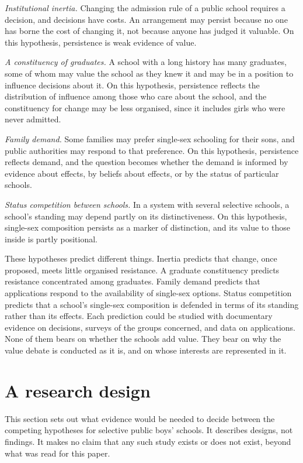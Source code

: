 \documentclass[11pt]{article}
\begin{document}
\emph{Institutional inertia.} Changing the admission rule of a public school requires a decision, and decisions have costs. An arrangement may persist because no one has borne the cost of changing it, not because anyone has judged it valuable. On this hypothesis, persistence is weak evidence of value.

\emph{A constituency of graduates.} A school with a long history has many graduates, some of whom may value the school as they knew it and may be in a position to influence decisions about it. On this hypothesis, persistence reflects the distribution of influence among those who care about the school, and the constituency for change may be less organised, since it includes girls who were never admitted.

\emph{Family demand.} Some families may prefer single-sex schooling for their sons, and public authorities may respond to that preference. On this hypothesis, persistence reflects demand, and the question becomes whether the demand is informed by evidence about effects, by beliefs about effects, or by the status of particular schools.

\emph{Status competition between schools.} In a system with several selective schools, a school's standing may depend partly on its distinctiveness. On this hypothesis, single-sex composition persists as a marker of distinction, and its value to those inside is partly positional.

These hypotheses predict different things. Inertia predicts that change, once proposed, meets little organised resistance. A graduate constituency predicts resistance concentrated among graduates. Family demand predicts that applications respond to the availability of single-sex options. Status competition predicts that a school's single-sex composition is defended in terms of its standing rather than its effects. Each prediction could be studied with documentary evidence on decisions, surveys of the groups concerned, and data on applications. None of them bears on whether the schools add value. They bear on why the value debate is conducted as it is, and on whose interests are represented in it.

\section{A research design}\label{sec:design}

This section sets out what evidence would be needed to decide between the competing hypotheses for selective public boys' schools. It describes designs, not findings. It makes no claim that any such study exists or does not exist, beyond what was read for this paper.
\end{document}
